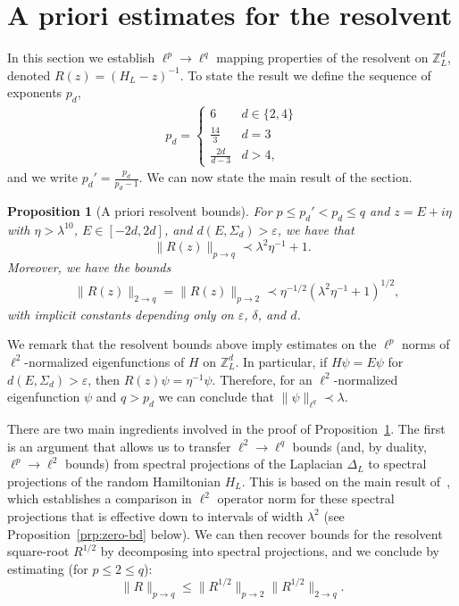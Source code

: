 \documentclass[11pt]{amsart}
\def\bbZ{{\mathbb Z}}
\def\Z{{\mathbb{Z}}}
\def\eps{{\varepsilon}}
\newcommand{\ldom}{\prec}
\numberwithin{equation}{section}
\numberwithin{theorem}{section}
\newtheorem{proposition}[theorem]{Proposition}
\begin{document}
\section{A priori estimates for the resolvent}
\label{sec:resolvents}
In this section we establish $\ell^p\to\ell^q$ mapping properties of the resolvent on $\Z^d_L$, denoted $R(z)=(H_L-z)^{-1}$.
To state the result we define the sequence of exponents $p_d$,
\begin{align*}
p_d=\begin{cases}
6&d\in\{2,4\}\\
\frac{14}{3}&d=3\\
\frac{2d}{d-3}&d> 4,
\end{cases}
\end{align*}
and we write $p_d' = \frac{p_d}{p_d-1}$.  We can now state the main result of the section.
\begin{proposition}[A priori resolvent bounds]
\label{prp:apriori}
For $p\leq p_d'<p_d\leq q$ and $z=E+i\eta$ with $\eta>\lambda^{10}$, $E\in[-2d,2d]$,
and $d(E,\Sigma_d)>\eps$, we have that
\begin{equation}
\label{eq:pq-apriori}
\|R(z)\|_{p\to q} \ldom \lambda^2\eta^{-1} + 1.
\end{equation}
Moreover, we have the bounds
\begin{align}
\label{eq:one-two-apriori}
&\|R(z)\|_{2\to q} = \|R(z)\|_{p\to 2} \ldom \eta^{-1/2}(\lambda^2\eta^{-1}+1)^{1/2},
\end{align}
with implicit constants depending only on $\eps$, $\delta$, and $d$.
\end{proposition}
We remark that the resolvent bounds above imply estimates on the $\ell^p$ norms of $\ell^2$-normalized eigenfunctions of $H$ on $\bbZ^d_L$.  In particular, if $H\psi = E\psi$ for $d(E,\Sigma_d)>\eps$, then $R(z)\psi = \eta^{-1}\psi$.  Therefore, for an $\ell^2$-normalized eigenfunction $\psi$ and  $q > p_d$ we can conclude that $\|\psi\|_{\ell^q} \ldom \lambda$.

There are two main ingredients involved in the proof of Proposition~\ref{prp:apriori}.  The first is an argument that allows us to transfer
$\ell^2\to \ell^q$ bounds (and, by duality, $\ell^p\to\ell^2$ bounds) from spectral projections of the Laplacian $\Delta_L$ to spectral
projections of the random Hamiltonian $H_L$.  This is based on the main result of~\cite{BDH}, which establishes a comparison in $\ell^2$
operator norm for these spectral projections that is effective down to intervals of width $\lambda^2$ (see Proposition~\ref{prp:zero-bd} below).  We can then recover bounds for the resolvent square-root $R^{1/2}$
by decomposing into spectral projections, and we conclude by estimating (for $p\leq 2\leq q$):
\[
\|R\|_{p\to q} \leq \|R^{1/2}\|_{p\to 2} \|R^{1/2}\|_{2\to q}.
\]
\end{document}

